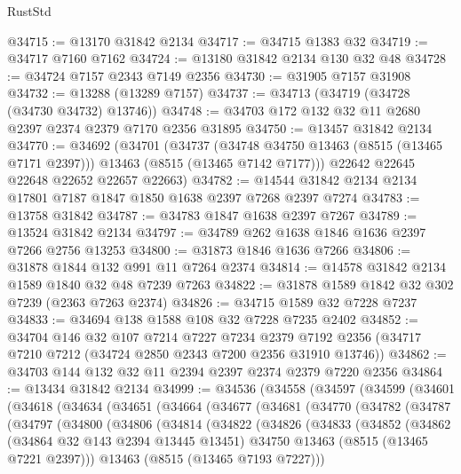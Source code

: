 \begin{lexlean}{RustStd}
\begin{coremodule}
@34715 := @13170 @31842 @2134
@34717 := @34715 @1383 @32
@34719 := @34717 @7160 @7162
@34724 := @13180 @31842 @2134 @130 @32 @48
@34728 := @34724 @7157 @2343 @7149 @2356
@34730 := @31905 @7157 @31908
@34732 := @13288 (@13289 @7157)
@34737 := @34713 (@34719 (@34728 (@34730 @34732) @13746))
@34748 := @34703 @172 @132 @32 @11 @2680 @2397 @2374 @2379 @7170 @2356 @31895
@34750 := @13457 @31842 @2134
@34770 := @34692
    (@34701
      (@34737
        (@34748 @34750 @13463 (@8515 (@13465 @7171 @2397)))
        @13463
        (@8515 (@13465 @7142 @7177)))
      @22642
      @22645
      @22648
      @22652
      @22657
      @22663)
@34782 := @14544 @31842 @2134 @2134 @17801 @7187 @1847 @1850 @1638 @2397 @7268 @2397 @7274
@34783 := @13758 @31842
@34787 := @34783 @1847 @1638 @2397 @7267
@34789 := @13524 @31842 @2134
@34797 := @34789 @262 @1638 @1846 @1636 @2397 @7266 @2756 @13253
@34800 := @31873 @1846 @1636 @7266
@34806 := @31878 @1844 @132 @991 @11 @7264 @2374
@34814 := @14578 @31842 @2134 @1589 @1840 @32 @48 @7239 @7263
@34822 := @31878 @1589 @1842 @32 @302 @7239 (@2363 @7263 @2374)
@34826 := @34715 @1589 @32 @7228 @7237
@34833 := @34694 @138 @1588 @108 @32 @7228 @7235 @2402
@34852 := @34704
    @146
    @32
    @107
    @7214
    @7227
    @7234
    @2379
    @7192
    @2356
    (@34717 @7210 @7212 (@34724 @2850 @2343 @7200 @2356 @31910 @13746))
@34862 := @34703 @144 @132 @32 @11 @2394 @2397 @2374 @2379 @7220 @2356
@34864 := @13434 @31842 @2134
@34999 := @34536
    (@34558
      (@34597
        (@34599
          (@34601
            (@34618
              (@34634
                (@34651
                  (@34664
                    (@34677
                      (@34681
                        (@34770
                          (@34782
                            (@34787
                              (@34797
                                (@34800
                                  (@34806
                                    (@34814
                                      (@34822
                                        (@34826
                                          (@34833
                                            (@34852
                                              (@34862
                                                (@34864 @32 @143 @2394 @13445 @13451)
                                                @34750
                                                @13463
                                                (@8515 (@13465 @7221 @2397)))
                                              @13463
                                              (@8515 (@13465 @7193 @7227)))

\end{coremodule}
\end{lexlean}
